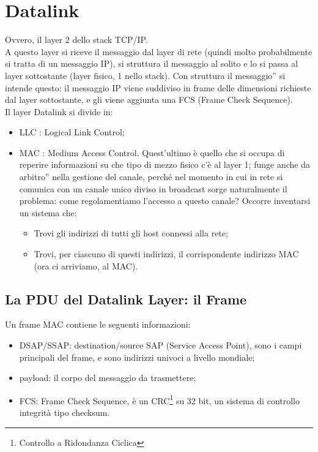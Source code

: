\section*{\textcolor{Sepia}{Datalink}}
\noindent Ovvero, il layer 2 dello stack TCP/IP.\\
\noindent A questo layer si riceve il messaggio dal layer di rete (quindi molto probabilmente si tratta di un messaggio IP), si struttura il messaggio al solito e lo si passa al layer sottostante (layer fisico, 1 nello stack). Con \openapex struttura il messaggio'' si intende questo: il messaggio IP viene suddiviso in frame delle dimensioni richieste dal layer sottostante, e gli viene aggiunta una FCS (Frame Check Sequence).\\

\noindent Il layer Datalink si divide in:
\begin{itemize}
    \item LLC : Logical Link Control;
    \item MAC : Medium Access Control. Quest'ultimo è quello che si occupa di reperire informazioni su che tipo di mezzo fisico c'è al layer 1; funge anche da \openapex arbitro'' nella gestione del canale, perché nel momento in cui in rete si comunica con un canale unico diviso in broadcast sorge naturalmente il problema: come regolamentiamo l'accesso a questo canale? Occorre inventarsi un sistema che:
    \begin{itemize}
        \item Trovi gli indirizzi di tutti gli host connessi alla rete;
        \item Trovi, per ciascuno di questi indirizzi, il corrispondente indirizzo MAC (ora ci arriviamo, al MAC).
    \end{itemize}
\end{itemize}

\subsection*{La PDU del Datalink Layer: il Frame}
\noindent Un frame MAC contiene le seguenti informazioni:\begin{itemize}
    \item DSAP/SSAP: destination/source SAP (Service Access Point), sono i campi principali del frame, e sono indirizzi univoci a livello mondiale;
    \item payload: il corpo del messaggio da trasmettere;
    \item FCS: Frame Check Sequence, è un CRC\footnote{Controllo a Ridondanza Ciclica} su 32 bit, un sistema di controllo integrità tipo checksum.
\end{itemize}

